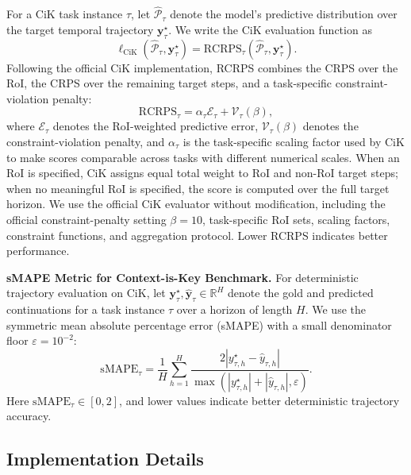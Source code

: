 For a CiK task instance $\tau$, let $\widehat{\mathcal{P}}_{\tau}$ denote the
model's predictive distribution over the target temporal trajectory
$\bm{y}^{\star}_{\tau}$. We write the CiK evaluation function as
\begin{equation}
    \ell_{\mathrm{CiK}}
    (\widehat{\mathcal{P}}_{\tau}, \bm{y}^{\star}_{\tau})
    =
    \mathrm{RCRPS}_{\tau}
    (\widehat{\mathcal{P}}_{\tau}, \bm{y}^{\star}_{\tau}).
\end{equation}
Following the official CiK implementation, RCRPS combines the CRPS over the
RoI, the CRPS over the remaining target steps, and a task-specific
constraint-violation penalty:
\begin{equation}
    \mathrm{RCRPS}_{\tau}
    =
    \alpha_{\tau}\mathcal{E}_{\tau}
    +
    \mathcal{V}_{\tau}(\beta),
\end{equation}
where $\mathcal{E}_{\tau}$ denotes the RoI-weighted predictive error, $\mathcal{V}_{\tau}(\beta)$ denotes the constraint-violation penalty, and $\alpha_{\tau}$ is the task-specific scaling factor used by CiK to make scores comparable across tasks with different numerical scales. When an RoI is specified, CiK assigns equal total weight to RoI and non-RoI target steps; when no meaningful RoI is specified, the score is computed over the full target horizon. We use the official CiK evaluator without modification, including the official constraint-penalty setting $\beta=10$, task-specific RoI sets, scaling factors, constraint functions, and aggregation protocol. Lower RCRPS indicates better performance.

\vspace{3mm}
\noindent\textbf{sMAPE Metric for Context-is-Key Benchmark.}
For deterministic trajectory evaluation on CiK, let $\bm{y}^{\star}_{\tau},\widehat{\bm{y}}_{\tau}\in\mathbb{R}^{H}$ denote the gold and predicted continuations for a task instance $\tau$ over a horizon of length $H$. We use the symmetric mean absolute percentage error (sMAPE) with a small denominator floor $\varepsilon=10^{-2}$:
\begin{equation}
\mathrm{sMAPE}_{\tau}
=
\frac{1}{H}\sum_{h=1}^{H}
\frac{2|y^{\star}_{\tau,h}-\widehat{y}_{\tau,h}|}
{\max(|y^{\star}_{\tau,h}|+|\widehat{y}_{\tau,h}|,\varepsilon)}.
\end{equation}
Here $\mathrm{sMAPE}_{\tau}\in[0,2]$, and lower values indicate better
deterministic trajectory accuracy.

\subsection{Implementation Details}
\label{app:impl}

